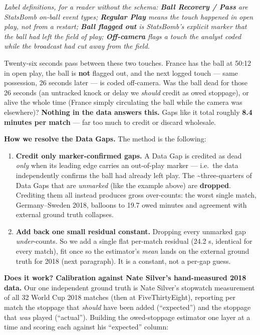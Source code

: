 \documentclass[
]{article}
\providecommand{\tightlist}{%
  \setlength{\itemsep}{0pt}\setlength{\parskip}{0pt}}
\begin{document}
\emph{Label definitions, for a reader without the schema: \textbf{Ball
Recovery / Pass} are StatsBomb on-ball event types; \textbf{Regular
Play} means the touch happened in open play, not from a restart;
\textbf{Ball flagged out} is StatsBomb's explicit marker that the ball
had left the field of play; \textbf{Off-camera} flags a touch the
analyst coded while the broadcast had cut away from the field.}

Twenty-six seconds pass between these two touches. France has the ball
at 50:12 in open play, the ball is \textbf{not} flagged out, and the
next logged touch --- same possession, 26 seconds later --- is coded
off-camera. Was the ball dead for those 26 seconds (an untracked knock
or delay we \emph{should} credit as owed stoppage), or alive the whole
time (France simply circulating the ball while the camera was
elsewhere)? \textbf{Nothing in the data answers this.} Gaps like it
total roughly \textbf{8.4 minutes per match} --- far too much to credit
or discard wholesale.

\textbf{How we resolve the Data Gaps.} The method is the following:

\begin{enumerate}
\def\labelenumi{\arabic{enumi}.}
\tightlist
\item
  \textbf{Credit only marker-confirmed gaps.} A Data Gap is credited as
  dead \emph{only} when its leading edge carries an out-of-play marker
  --- i.e.~the data independently confirms the ball had already left
  play. The \textasciitilde three-quarters of Data Gaps that are
  \emph{unmarked} (like the example above) are \textbf{dropped}.
  Crediting them all instead produces gross over-counts: the worst
  single match, Germany--Sweden 2018, balloons to 19.7 owed minutes and
  agreement with external ground truth collapses.
\item
  \textbf{Add back one small residual constant.} Dropping every unmarked
  gap \emph{under}-counts. So we add a single flat per-match residual
  (24.2 s, identical for every match), fit once so the estimator's
  \emph{mean} lands on the external ground truth for 2018 (next
  paragraph). It is a constant, not a per-gap guess.
\end{enumerate}

\textbf{Does it work? Calibration against Nate Silver's hand-measured
2018 data.} Our one independent ground truth is Nate Silver's stopwatch
measurement of all 32 World Cup 2018 matches (then at FiveThirtyEight),
reporting per match the stoppage that \emph{should} have been added
(``expected'') and the stoppage that \emph{was} played (``actual'').
Building the owed-stoppage estimator one layer at a time and scoring
each against his ``expected'' column:
\end{document}
